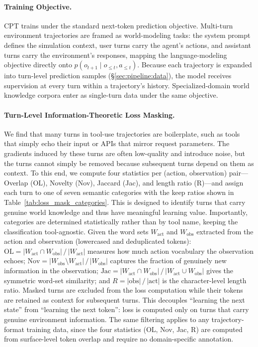 \paragraph{Training Objective.}
CPT trains under the standard next-token prediction objective.
Multi-turn environment trajectories are framed as world-modeling tasks: the system prompt defines the simulation context, user turns carry the agent's actions, and assistant turns carry the environment's responses, mapping the language-modeling objective directly onto $p(o_{t+1} \mid o_{\leq t}, a_{\leq t})$.
Because each trajectory is expanded into turn-level prediction samples (\S\ref{sec:pipeline:data}), the model receives supervision at every turn within a trajectory's history.
Specialized-domain world knowledge corpora enter as single-turn data under the same objective.

\paragraph{Turn-Level Information-Theoretic Loss Masking.}
We find that many turns in tool-use trajectories are boilerplate, such as tools that simply echo their input or APIs that mirror request parameters.
The gradients induced by these turns are often low-quality and introduce noise, but the turns cannot simply be removed because subsequent turns depend on them as context.
To this end, we compute four statistics per (action, observation) pair---Overlap (OL), Novelty (Nov), Jaccard (Jac), and length ratio (R)---and assign each turn to one of seven semantic categories with the keep ratios shown in Table~\ref{tab:loss_mask_categories}.
This is designed to identify turns that carry genuine world knowledge and thus have meaningful learning value.
Importantly, categories are determined statistically rather than by tool name, keeping the classification tool-agnostic.
Given the word sets $W_{\text{act}}$ and $W_{\text{obs}}$ extracted from the action and observation (lowercased and deduplicated tokens):
$\text{OL} = |W_{\text{act}} \cap W_{\text{obs}}| \,/\, |W_{\text{act}}|$ measures how much action vocabulary the observation echoes;
$\text{Nov} = |W_{\text{obs}} \setminus W_{\text{act}}| \,/\, |W_{\text{obs}}|$ captures the fraction of genuinely new information in the observation;
$\text{Jac} = |W_{\text{act}} \cap W_{\text{obs}}| \,/\, |W_{\text{act}} \cup W_{\text{obs}}|$ gives the symmetric word-set similarity;
and $R = |\text{obs}| \,/\, |\text{act}|$ is the character-level length ratio.
Masked turns are excluded from the loss computation while their tokens are retained as context for subsequent turns.
This decouples ``learning the next state'' from ``learning the next token'': loss is computed only on turns that carry genuine environment information.
The same filtering applies to any trajectory-format training data, since the four statistics (OL, Nov, Jac, R) are computed from surface-level token overlap and require no domain-specific annotation.

